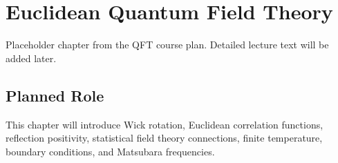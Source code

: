 \chapter{Euclidean Quantum Field Theory}

\begin{remarkbox}
Placeholder chapter from the QFT course plan. Detailed lecture text will be added later.
\end{remarkbox}

\section{Planned Role}

This chapter will introduce Wick rotation, Euclidean correlation functions, reflection positivity, statistical field theory connections, finite temperature, boundary conditions, and Matsubara frequencies.
